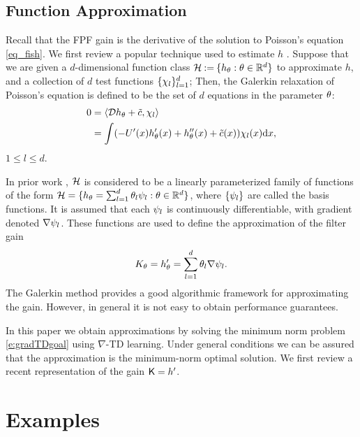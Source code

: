 
\subsection{Function Approximation}

Recall that the FPF gain is the derivative of the solution to Poisson's equation \eqref{eq_fish}.
We first review a popular technique used to estimate $h$ \cite{yanmehmey13,yanlaumehmey16}.
Suppose that we are given a $d$-dimensional  function class
${\cal H}  \mathbin{:=} \{h_{\theta} : \theta \in \mathbb{R}^d\}$ to approximate $h$, and a collection of $d$ test functions $\{\chi_{l}\}_{l=1}^{d}$; Then, the Galerkin relaxation of Poisson's equation is defined to be the set of $d$ equations in the parameter $\theta$:
\begin{equation}
\begin{aligned}
0 &= \langle \clD h_{\param}+\tilc, \test_{l} \rangle \\
&= \int (-U'(x) h_{\param}'(x)+ h_{\param}''(x)+\tilc (x))\test_{l}(x) \ud x,
\end{aligned}
\label{eq_weak_formulation}
\end{equation}
$ 1\leq l \leq d$.


In prior work \cite{yanmehmey13,yanlaumehmey16}, ${\cal H}$ is considered to be a linearly parameterized family of functions of the form ${\cal H} =\{ h_{\theta} = \sum_{l=1}^{d}\theta_{l}\psi_{l} : \theta\in\mathbb{R}^d\}$, where $\{\psi_l\}$ are called the basis functions. It is assumed that each $\psi_l$ is continuously differentiable,  with gradient denoted   $\nabla \psi_{l} $. These   functions are used to define the approximation of the filter gain
\begin{equation}
K_\param = h_{\param}' = \sum_{l=1}^{d}\param_{l}\gradbasis_{l}.
\label{eq_basis_galerkin}
\end{equation}
The
Galerkin method provides a good algorithmic framework for approximating the gain. However, in general it is not easy to obtain performance guarantees.

In this paper we obtain approximations by solving  the minimum norm problem \eqref{e:gradTDgoal} using $\nabla$-TD learning.  Under general conditions we can be assured that the approximation is the minimum-norm optimal solution.   We first review a recent representation of the gain $\text{\sf K} = h'$.
\section{Examples}
\label{s:ex}

